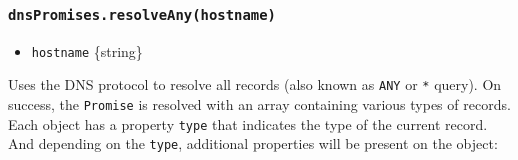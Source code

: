\subsubsection{\texorpdfstring{\texttt{dnsPromises.resolveAny(hostname)}}{dnsPromises.resolveAny(hostname)}}\label{dnspromises.resolveanyhostname}

\begin{itemize}
\tightlist
\item
  \texttt{hostname} \{string\}
\end{itemize}

Uses the DNS protocol to resolve all records (also known as \texttt{ANY}
or \texttt{*} query). On success, the \texttt{Promise} is resolved with
an array containing various types of records. Each object has a property
\texttt{type} that indicates the type of the current record. And
depending on the \texttt{type}, additional properties will be present on
the object:

